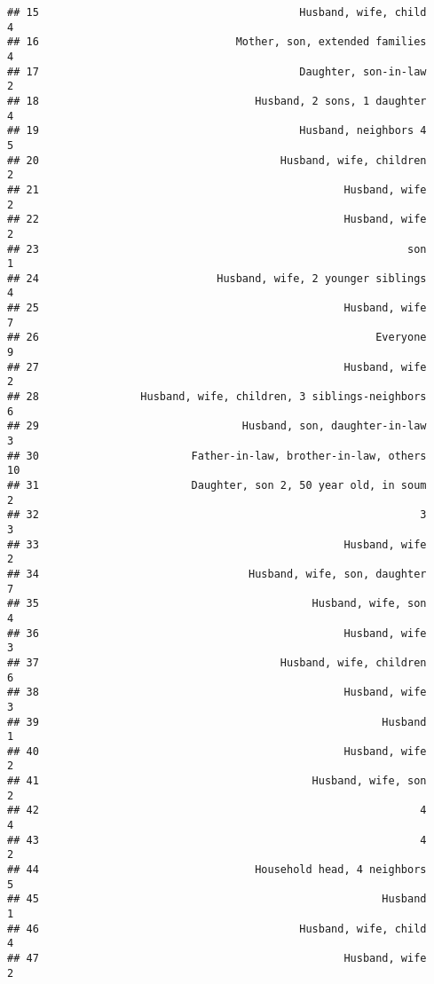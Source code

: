 \documentclass[
]{article}
\begin{document}
\begin{verbatim}
## 15                                         Husband, wife, child             4
## 16                               Mother, son, extended families             4
## 17                                         Daughter, son-in-law             2
## 18                                  Husband, 2 sons, 1 daughter             4
## 19                                         Husband, neighbors 4             5
## 20                                      Husband, wife, children             2
## 21                                                Husband, wife             2
## 22                                                Husband, wife             2
## 23                                                          son             1
## 24                            Husband, wife, 2 younger siblings             4
## 25                                                Husband, wife             7
## 26                                                     Everyone             9
## 27                                                Husband, wife             2
## 28                Husband, wife, children, 3 siblings-neighbors             6
## 29                                Husband, son, daughter-in-law             3
## 30                        Father-in-law, brother-in-law, others            10
## 31                        Daughter, son 2, 50 year old, in soum             2
## 32                                                            3             3
## 33                                                Husband, wife             2
## 34                                 Husband, wife, son, daughter             7
## 35                                           Husband, wife, son             4
## 36                                                Husband, wife             3
## 37                                      Husband, wife, children             6
## 38                                                Husband, wife             3
## 39                                                      Husband             1
## 40                                                Husband, wife             2
## 41                                           Husband, wife, son             2
## 42                                                            4             4
## 43                                                            4             2
## 44                                  Household head, 4 neighbors             5
## 45                                                      Husband             1
## 46                                         Husband, wife, child             4
## 47                                                Husband, wife             2

\end{verbatim}
\end{document}
